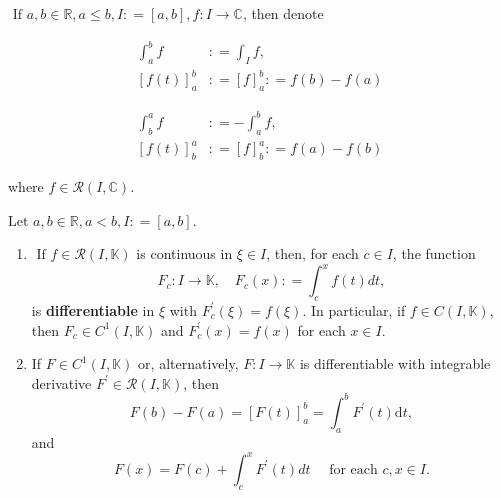 \begin{leftbar}
$\text{ If } a ,b \in \mathbb { R } ,a \leq b ,I : = [ a ,b ] ,f : I \rightarrow \mathbb { C }$, then denote

\noindent\begin{minipage}{.5\linewidth}
\begin{equation}
\begin{split}
\int _ { a } ^ { b } f &: = \int _ { I } f, \\ 
[ f ( t ) ] _ { a } ^ { b } &: = [ f ] _ { a } ^ { b } : = f ( b ) - f ( a )
\end{split}
\end{equation}
\end{minipage}%
\begin{minipage}{.5\linewidth}
\begin{equation}
\begin{split}
\int _ { b } ^ { a } f &: = - \int _ { a } ^ { b } f, \\
[ f ( t ) ] _ { b } ^ { a } &: = [ f ] _ { b } ^ { a } : = f ( a ) - f ( b )
\end{split}
\end{equation}
\end{minipage}%

where $f \in \mathcal { R } ( I ,\mathbb { C } )$.

\end{leftbar}

$\text{Let } a ,b \in \mathbb { R } ,a < b ,I : = [ a ,b ]$.
\begin{enumerate}
\item $\text{ If } f \in \mathcal { R } ( I ,\mathbb { K } )$ is continuous in $\xi \in I$, then, for each $c \in I$, the function
\begin{equation}
F _ { c } : I \rightarrow \mathbb { K } ,\quad F _ { c } ( x ) : = \int _ { c } ^ { x } f ( t ) d t,
\end{equation}
is \textbf{differentiable} in $\xi$ with $F _ { c } ^ { \prime } ( \xi ) = f ( \xi )$. In particular, if $f \in C ( I ,\mathbb { K } )$, then $F _ { c } \in C ^ { 1} ( I ,\mathbb { K } )$ and $F _ { c } ^ { \prime } ( x ) = f ( x )$ for each $x \in I$.

\item If $F \in C ^ { 1} ( I ,\mathbb { K } )$ or, alternatively, $F : I \rightarrow \mathbb { K }$ is differentiable with integrable derivative $F ^ { \prime } \in \mathcal { R } ( I ,\mathbb { K } )$, then 
\begin{equation}
F ( b ) - F ( a ) = [ F ( t ) ] _ { a } ^ { b } = \int _ { a } ^ { b } F ^ { \prime } ( t ) \text{d} t,
\end{equation}
and
\begin{equation}
F ( x ) = F ( c ) + \int _ { c } ^ { x } F ^ { \prime } ( t ) d t \quad \text{ for each } c ,x \in I.
\end{equation}

\end{enumerate}


